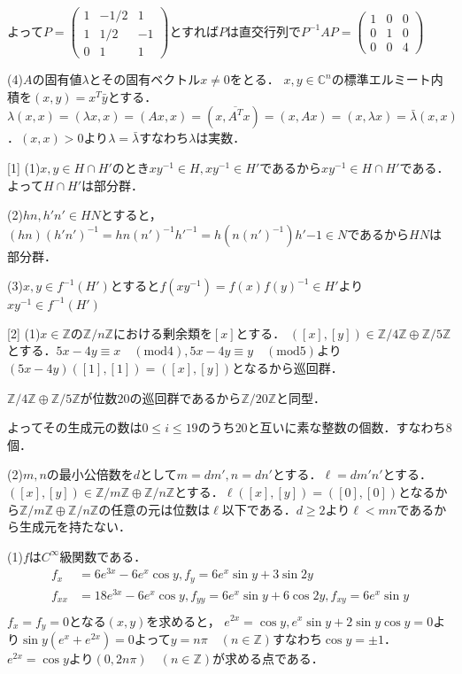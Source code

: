 \documentclass[
		book,
		head_space=20mm,
		foot_space=20mm,
		gutter=10mm,
		line_length=190mm
]{jlreq}
\begin{document}
よって$P=\begin{pmatrix}
    1 & -1/2 & 1\\
    1 & 1/2 & -1\\
    0 & 1 & 1 
\end{pmatrix}$とすれば$P$は直交行列で$P^{-1}AP=\begin{pmatrix}
    1 & 0 & 0\\
    0 & 1 & 0 \\
    0 & 0 & 4
\end{pmatrix}$

(4)$A$の固有値$\lambda$とその固有ベクトル$x\neq 0$をとる．
$x,y\in \mathbb{C}^n$の標準エルミート内積を$(x,y)=x^{T}\bar{y}$とする．
$\lambda(x,x)=(\lambda x,x)=(Ax,x)=(x,\overline{A^T}x)=(x,Ax)=(x,\lambda x)=\bar{\lambda}(x,x)$．$(x,x)>0$より$\lambda=\bar{\lambda}$すなわち$\lambda$は実数．

[1]
(1)$x,y\in H\cap H'$のとき$xy^{-1}\in H , xy^{-1}\in H'$であるから$xy^{-1}\in H\cap H'$である．よって$H\cap H'$は部分群．

(2)$hn,h'n'\in HN$とすると，
$(hn)(h'n')^{-1}=hn(n')^{-1}h'^{-1}=h(n(n')^{-1})h'{-1}\in N$であるから$HN$は部分群．

(3)$x,y\in f^{-1}(H')$とすると$f(xy^{-1})=f(x)f(y)^{-1}\in H'$より$xy^{-1}\in f^{-1}(H')$

[2]
(1)$x\in \mathbb{Z}$の$\mathbb{Z}/n \mathbb{Z}$における剰余類を$[x]$とする．
$([x],[y])\in \mathbb{Z}/4 \mathbb{Z} \oplus \mathbb{Z}/5 \mathbb{Z}$とする．$5x-4y\equiv x \quad(\mathrm{mod}4),5x-4y\equiv y \quad(\mathrm{mod}5)$より$(5x-4y)([1],[1])=([x],[y])$となるから巡回群．

$\mathbb{Z}/4 \mathbb{Z} \oplus \mathbb{Z}/5 \mathbb{Z}$が位数$20$の巡回群であるから$\mathbb{Z}/20 \mathbb{Z}$と同型．

よってその生成元の数は$0\le i \le 19$のうち$20$と互いに素な整数の個数．すなわち$8$個．

(2)$m,n$の最小公倍数を$d$として$m=dm',n=dn'$とする．$\ell=dm'n'$とする．
$([x],[y])\in \mathbb{Z}/m \mathbb{Z} \oplus \mathbb{Z}/n \mathbb{Z}$とする．$\ell ([x],[y])=([0],[0])$となるから$\mathbb{Z}/m \mathbb{Z} \oplus \mathbb{Z}/n \mathbb{Z}$の任意の元は位数は$\ell$以下である．$d\ge 2$より$\ell < mn$であるから生成元を持たない．

(1)$f$は$C^{\infty}$級関数である．
\begin{align}
    f_x&=6e^{3x}-6e^x\cos y,f_y=6e^x \sin y+3\sin 2y \\
    f_{xx}&=18e^{3x}-6e^x\cos y,f_{yy}=6e^x \sin y+6\cos 2y,f_{xy}=6e^x \sin y \\
\end{align}
$f_x=f_y=0$となる$(x,y)$を求めると，
$e^{2x}=\cos y,e^x\sin y+2\sin y\cos y=0$より$\sin y (e^x+e^{2x})=0$よって$y=n\pi\quad (n \in \mathbb{Z})$すなわち$\cos y = \pm 1$．$e^{2x}=\cos y$より$(0,2n\pi)\quad(n \in \mathbb{Z})$が求める点である．
\end{document}
